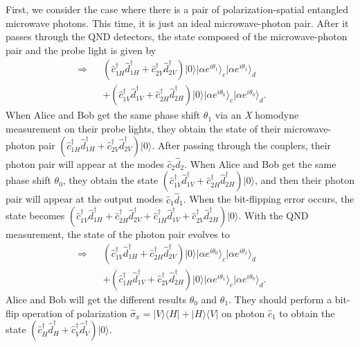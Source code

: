 \documentclass[showpacs,aps,graphicx,twocolumn]{revtex4}
\begin{document}
First, we consider the case where there is a pair of
polarization-spatial entangled microwave photons. This time, it
is just an ideal microwave-photon pair. After it passes through the
QND detectors, the state composed of the microwave-photon pair and
the probe light is given by
\begin{eqnarray}        \label{eq15}
\Longrightarrow\!\!\!\!&&(\hat{c}_{1H}^{\dag}\hat{d}_{1H}^{\dag}
+\hat{c}_{2V}^{\dag}\hat{d}_{2V}^{\dag})|0\rangle|\alpha
e^{i\theta_{1}}\rangle_{c}
|\alpha e^{i\theta_{1}}\rangle_{d}\nonumber\\
&&+(\hat{c}_{1V}^{\dag}\hat{d}_{1V}^{\dag}+\hat{c}_{2H}^{\dag}\hat{d}_{2H}^{\dag})
|0\rangle|\alpha e^{i\theta_{0}}\rangle_{c}|\alpha
e^{i\theta_{0}}\rangle_{d}.\;\;\;\;\;\;
\end{eqnarray}
When Alice and Bob get the same phase shift $\theta_{1}$ via an \emph{X}
homodyne measurement on their probe lights, they obtain the state of
their microwave-photon pair
$(\hat{c}_{1H}^{\dag}\hat{d}_{1H}^{\dag}+\hat{c}_{2V}^{\dag}\hat{d}_{2V}^{\dag})|0\rangle$.
After passing through the couplers, their photon pair will appear at
the modes $\hat{c}_{2}\hat{d}_{2}$. When Alice and Bob get the same
phase shift $\theta_{0}$, they obtain the state
$(\hat{c}_{1V}^{\dag}\hat{d}_{1V}^{\dag}+\hat{c}_{2H}^{\dag}\hat{d}_{2H}^{\dag})|0\rangle$,
and then their photon pair will appear at the output modes
$\hat{c}_{1}\hat{d}_{1}$. When the bit-flipping error occurs, the
state becomes
$(\hat{c}_{1V}^{\dag}\hat{d}_{1H}^{\dag}+\hat{c}_{2H}^{\dag}\hat{d}_{2V}^{\dag}
+\hat{c}_{1H}^{\dag}\hat{d}_{1V}^{\dag}+\hat{c}_{2V}^{\dag}\hat{d}_{2H}^{\dag})|0\rangle$.
With the QND measurement, the state of the photon pair evolves to
\begin{eqnarray}        \label{eq16}
\Longrightarrow\!\!\!\!&&(\hat{c}_{1V}^{\dag}\hat{d}_{1H}^{\dag}
+\hat{c}_{2H}^{\dag}\hat{d}_{2V}^{\dag})|0\rangle|\alpha
e^{i\theta_{0}}\rangle_{c}
|\alpha e^{i\theta_{1}}\rangle_{d}\nonumber\\
&&+(\hat{c}_{1H}^{\dag}\hat{d}_{1V}^{\dag}+\hat{c}_{2V}^{\dag}\hat{d}_{2H}^{\dag})
|0\rangle|\alpha e^{i\theta_{1}}\rangle_{c}|\alpha
e^{i\theta_{0}}\rangle_{d}.\;\;\;\;\;\;
\end{eqnarray}
Alice and Bob will get the different results $\theta_{0}$ and
$\theta_{1}$. They should perform a bit-flip operation of
polarization $\hat{\sigma}_{x}=|V\rangle\langle
H|+|H\rangle\langle V|$ on photon $\hat{c}_1$ to obtain the state
$(\hat{c}_{H}^{\dag}\hat{d}_{H}^{\dag}+\hat{c}_{V}^{\dag}\hat{d}_{V}^{\dag})|0\rangle$.
\end{document}
